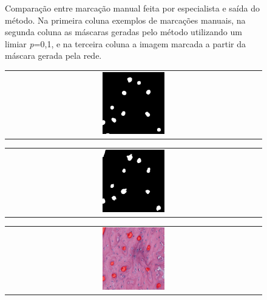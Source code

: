 \begin{figure}[H]
    \caption[Comparação entre marcação manual feita por especialista e saída do método.]{Comparação entre marcação manual feita por especialista e saída do método. Na primeira coluna exemplos de marcações manuais, na segunda coluna as máscaras geradas pelo método utilizando um limiar \textit{p}=0,1, e na terceira coluna a imagem marcada a partir da máscara gerada pela rede.}
    \label{fig:marcacoes-final-canal}
\end{figure}

\begin{figure}[H]
    \center
    \begin{tabular}{@{}c@{}}
        \includegraphics[width=0.25\textwidth]{figures/4_results/204_r3c2_mask_manual_10.png}
        \\[\abovecaptionskip]
    \end{tabular}
    \begin{tabular}{@{}c@{}}
        \includegraphics[width=0.25\textwidth]{figures/4_results/204_r3c2_mask_net_10.png}
        \\[\abovecaptionskip]
    \end{tabular}
    \begin{tabular}{@{}c@{}}
        \includegraphics[width=0.25\textwidth]{figures/4_results/204_r3c2_net_out_10.png}
        \\[\abovecaptionskip]
    \end{tabular}


\end{figure}
